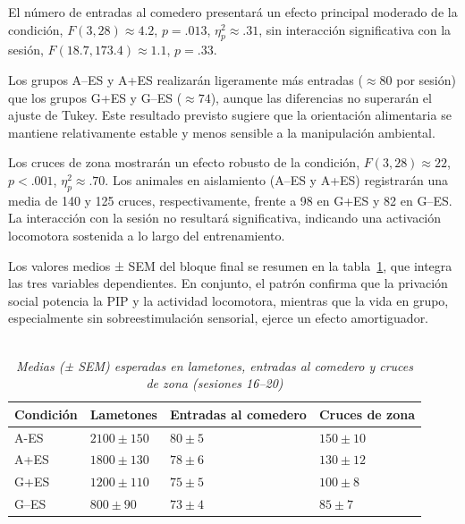 \documentclass[12pt,a4paper]{article}
\begin{document}
\begin{multicols}{2}
El número de entradas al comedero presentará un efecto principal moderado de la condición, $F(3, 28) \approx 4.2$, $p = .013$, $\eta^2_p \approx .31$, sin interacción significativa con la sesión, $F(18.7, 173.4) \approx 1.1$, $p = .33$.

Los grupos A--ES y A+ES realizarán ligeramente más entradas ($\approx 80$ por sesión) que los grupos G+ES y G--ES ($\approx 74$), aunque las diferencias no superarán el ajuste de Tukey. Este resultado previsto sugiere que la orientación alimentaria se mantiene relativamente estable y menos sensible a la manipulación ambiental.

Los cruces de zona mostrarán un efecto robusto de la condición, $F(3, 28) \approx 22$, $p < .001$, $\eta^2_p \approx .70$. Los animales en aislamiento (A--ES y A+ES) registrarán una media de 140 y 125 cruces, respectivamente, frente a 98 en G+ES y 82 en G--ES. La interacción con la sesión no resultará significativa, indicando una activación locomotora sostenida a lo largo del entrenamiento.

Los valores medios ± SEM del bloque final se resumen en la tabla~\ref{tab:tabla1}, que integra las tres variables dependientes. En conjunto, el patrón confirma que la privación social potencia la PIP y la actividad locomotora, mientras que la vida en grupo, especialmente sin sobreestimulación sensorial, ejerce un efecto amortiguador.


\begin{table}[t]
    \centering
    \begin{doublespace}
    \captionsetup{labelfont=bf, labelsep=none}
    \caption{\textit{\protect\\Medias (± SEM) esperadas en lametones, entradas al comedero y cruces de zona (sesiones 16--20)}}
    \label{tab:tabla1}
    \end{doublespace}
    \begin{tabularx}{\textwidth}{lXXX}
    \toprule
    \textbf{Condición} & \textbf{Lametones} & \textbf{Entradas al comedero} & \textbf{Cruces de zona} \\
    \midrule
    A-ES   & $2100 \pm 150$ & $80 \pm 5$ & $150 \pm 10$ \\
    A+ES  & $1800 \pm 130$ & $78 \pm 6$ & $130 \pm 12$ \\
    G+ES  & $1200 \pm 110$ & $75 \pm 5$ & $100 \pm 8$ \\
    G--ES & $800 \pm 90$   & $73 \pm 4$ & $85 \pm 7$ \\
    \bottomrule
    \end{tabularx}
    \vspace{1mm}
\end{table}



\end{multicols}
\end{document}
